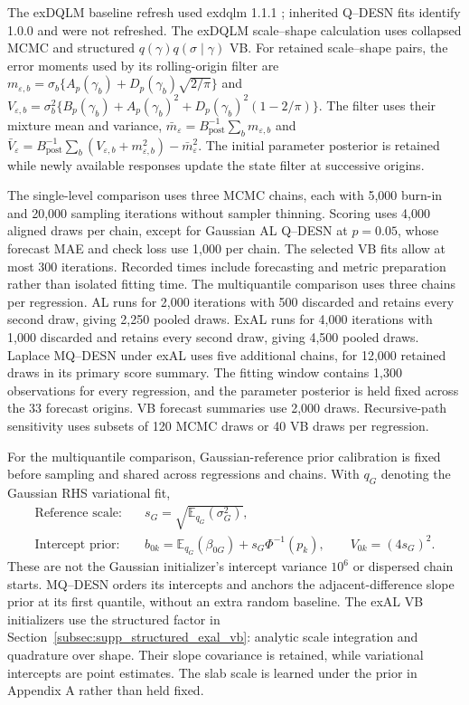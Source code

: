 \documentclass[12pt,letterpaper]{article}
\newcommand{\E}{\mathbb{E}}
\newcommand{\pkg}[1]{\textsf{#1}}
\numberwithin{suppalgorithm}{section}
\numberwithin{equation}{section}
\numberwithin{table}{section}
\numberwithin{figure}{section}
\begin{document}
The exDQLM baseline refresh used \pkg{exdqlm} 1.1.1
\citep{DeLeonEtAl2026Exdqlm}; inherited Q--DESN fits identify 1.0.0
and were not refreshed. The exDQLM scale--shape calculation uses collapsed
MCMC and structured \(q(\gamma)q(\sigma\mid\gamma)\) VB. For retained
scale--shape pairs, the error moments used by its rolling-origin filter are
\(m_{\varepsilon,b}=\sigma_b\{A_p(\gamma_b)+D_p(\gamma_b)\sqrt{2/\pi}\}\)
and \(V_{\varepsilon,b}=\sigma_b^2\{B_p(\gamma_b)+A_p(\gamma_b)^2+
D_p(\gamma_b)^2(1-2/\pi)\}\).
The filter uses their mixture mean and variance,
\(\bar m_\varepsilon=B_{\mathrm{post}}^{-1}\sum_bm_{\varepsilon,b}\)
and \(\bar V_\varepsilon=B_{\mathrm{post}}^{-1}
\sum_b(V_{\varepsilon,b}+m_{\varepsilon,b}^2)-\bar m_\varepsilon^2\).
The initial parameter posterior is retained while newly available responses
update the state filter at successive origins.

The single-level comparison uses three MCMC chains, each with 5,000
burn-in and 20,000 sampling iterations without sampler thinning. Scoring
uses 4,000 aligned draws per chain, except for Gaussian AL Q--DESN at
\(p=0.05\), whose forecast MAE and check loss use 1,000 per chain.
The selected VB fits allow at most 300 iterations. Recorded times include
forecasting and metric preparation rather than isolated fitting time.
The multiquantile comparison uses three chains per regression. AL runs
for 2,000 iterations with 500 discarded and retains every second draw,
giving 2,250 pooled draws. ExAL runs for 4,000 iterations with 1,000
discarded and retains every second draw, giving 4,500 pooled draws.
Laplace MQ--DESN under exAL uses five additional chains, for 12,000
retained draws in its primary score summary. The fitting window contains
1,300 observations for every regression, and the parameter posterior is
held fixed across the 33 forecast origins. VB forecast summaries use 2,000
draws. Recursive-path sensitivity uses subsets of 120 MCMC draws or 40 VB
draws per regression.

For the multiquantile comparison, Gaussian-reference prior calibration is
fixed before sampling and shared across regressions and chains. With
\(q_G\) denoting the Gaussian RHS variational fit,
\begin{equation}
\begin{aligned}
\text{Reference scale:}\quad&s_G=\sqrt{\E_{q_G}(\sigma_G^2)},\\
\text{Intercept prior:}\quad&b_{0k}=\E_{q_G}(\beta_{0G})+s_G\Phi^{-1}(p_k),
\qquad V_{0k}=(4s_G)^2.
\end{aligned}
\label{eq:supp-joint-intercept-calibration}
\end{equation}
These are not the Gaussian initializer's intercept variance \(10^6\) or
dispersed chain starts. MQ--DESN orders its intercepts and anchors the
adjacent-difference slope prior at its first quantile, without an extra
random baseline. The exAL VB initializers use the structured factor in
Section~\ref{subsec:supp_structured_exal_vb}: analytic scale integration
and quadrature over shape. Their slope covariance is retained, while
variational intercepts are point estimates. The slab scale is learned
under the prior in Appendix A rather than held fixed.
\end{document}
